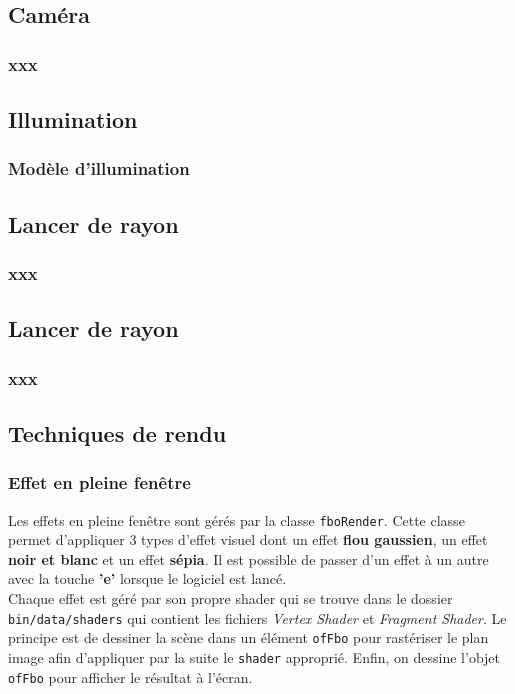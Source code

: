 \subsection{Caméra}
\subsubsection{xxx}

\subsection{Illumination}
\subsubsection{Modèle d'illumination}

\subsection{Lancer de rayon}
\subsubsection{xxx}

\subsection{Lancer de rayon}
\subsubsection{xxx}

\subsection{Techniques de rendu}
\subsubsection{Effet en pleine fenêtre}
Les effets en pleine fenêtre sont gérés par la classe \texttt{fboRender}. Cette classe permet d'appliquer 3 types d'effet visuel dont un effet \textbf{flou gaussien}, un effet \textbf{noir et blanc} et un effet \textbf{sépia}. Il est possible de passer d'un effet à un autre avec la touche \textbf{'e'} lorsque le logiciel est lancé. \\

Chaque effet est géré par son propre shader qui se trouve dans le dossier \texttt{bin/data/shaders} qui contient les fichiers \textit{Vertex Shader} et \textit{Fragment Shader}. Le principe est de dessiner la scène dans un élément \texttt{ofFbo} pour rastériser le plan image afin d'appliquer par la suite le \texttt{shader} approprié. Enfin, on dessine l'objet \texttt{ofFbo} pour afficher le résultat à l'écran.

